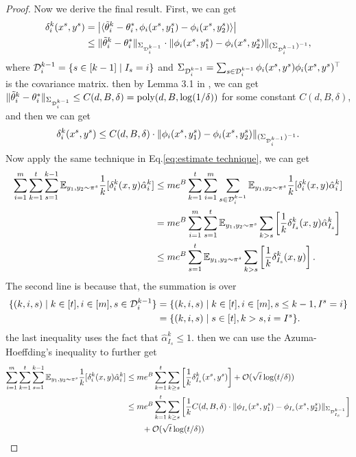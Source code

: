 \begin{proof}
    Now we derive the final result. First, we can get
\begin{align*}\delta_i^k(x^s,y^s) 
& = \left| \langle \tilde{\theta}_i^k-\theta_i^*, \phi_i(x^s,y_1^s) - \phi_i(x^s, y_2^s) \rangle\right|\\
& \le \|\tilde{\theta}_i^k - \theta_i^* \|_{\Sigma_{\mathcal{D}_i^{k-1}}}\cdot \|\phi_i(x^s,y_1^s)- \phi_i(x^s, y_2^s)\|_{(\Sigma_{\mathcal{D}_i^{k-1}})^{-1}},
\end{align*}
where $\mathcal{D}_{i}^{k-1} = \{s \in [k-1]\mid I_s = i\}$ and $\Sigma_{\mathcal{D}_i^{k-1}} = \sum_{s \in \mathcal{D}_i^{k-1}}\phi_i(x^s,y^s)\phi_i(x^s,y^s)^\top $ is the covariance matrix. 
then by Lemma 3.1 in \cite{zhu2023principled}, we can get $\|\tilde{\theta}_i^k - \theta_i^*\|_{\Sigma_{\mathcal{D}_i^{k-1}}} \le C(d, B, \delta) = \textrm{poly}(d,B, \log(1/\delta))$ for some constant $C(d,B,\delta)$, and then we can get 
\begin{align*}
    \delta_i^k(x^s,y^s) \le C(d,B,\delta)\cdot \|\phi_i(x^s,y_1^s)- \phi_i(x^s, y_2^s)\|_{(\Sigma_{\mathcal{D}_i^{k-1}})^{-1}}.
\end{align*}
Now apply the same technique in Eq.\eqref{eq:estimate technique}, we can get 
\begin{align*}
    \sum_{i=1}^m \sum_{k=1}^t \sum_{s=1}^{k-1} \mathbb{E}_{y_1,y_2\sim \pi^s} \frac{1}{k}[\delta_i^k(x,y)\hat{\alpha}_i^k] &\le me^B\sum_{k=1}^t \sum_{i=1}^m \sum_{s \in \mathcal{D}_i^{k-1}}\mathbb{E}_{y_1,y_2\sim \pi^s} \frac{1}{k}[\delta_i^k(x,y)\hat{\alpha}_{i}^k]\\
    & =me^B\sum_{i=1}^m\sum_{s=1}^t  \mathbb{E}_{y_1,y_2\sim \pi^s} \sum_{k>s} \left[\frac{1}{k}\delta_{I_s}^k(x,y)\hat{\alpha}_{I_s}^k\right]\\
    & \le me^B\sum_{s=1}^t  \mathbb{E}_{y_1,y_2\sim \pi^s} \sum_{k>s} \left[\frac{1}{k}\delta_{I_s}^k(x,y)\right].
\end{align*}
The second line is because that, the summation is over
\begin{align*}\{(k,i,s)\mid k \in [t],i \in [m] ,s \in \mathcal{D}_i^{k-1}\}&=\{(k,i,s)\mid k \in [t], i \in [m], s \le k-1, I^s = i\}\\
&=\{(k,i,s)\mid s \in [t], k > s, i = I^s\}.\end{align*}
the last inequality uses the fact that $\hat{\alpha}_{I_s}^k\le 1$.
then we can use the Azuma-Hoeffding's inequality to further get 
\begin{align}
    \sum_{i=1}^m \sum_{k=1}^t \sum_{s=1}^{k-1} \EE_{y_1,y_2\sim \pi^s} \frac{1}{k}[\delta_i^k(x,y)\hat{\alpha}_i^k] &\le me^B\sum_{k=1}^t  \sum_{k\ge  s} \left[\frac{1}{k}\delta_{I_s}^k(x^s,y^s)\right] + \cO(\sqrt{t}\log (t/\delta))\nonumber\\&\le me^B\sum_{k=1}^t  \sum_{k\ge  s} \left[\frac{1}{k}C(d,B,\delta)\cdot \|\phi_{I_s}(x^s,y_1^s) - \phi_{I_s}(x^s, y_2^s)\|_{\Sigma_{\cD_{I_s}^{k-1}}}\right]\nonumber\\&\qquad  + \cO(\sqrt{t}\log (t/\delta))\label{eq:alpha2}

\end{align}
\end{proof}
